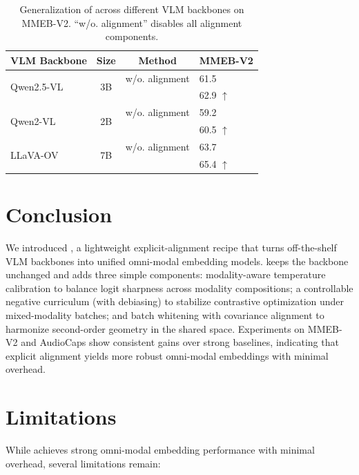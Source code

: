 
\begin{table}[t]
    \centering
    \small
    \caption{Generalization of \ours{} across different VLM backbones on MMEB-V2. ``w/o. alignment'' disables all alignment components.}\label{tab:generalization}
    \begin{tabular}{l c c l
    }
    \toprule
    \textbf{VLM Backbone} & \textbf{Size} & \textbf{Method} & \textbf{MMEB-V2} \\
    \midrule
    \multirow{2}{*}{Qwen2.5-VL} & \multirow{2}{*}{3B} 
        & w/o. alignment & 61.5 \\
     &  & \ours{} & 62.9 $\uparrow$ \\
    \midrule
    \multirow{2}{*}{Qwen2-VL} & \multirow{2}{*}{2B} 
        & w/o. alignment & 59.2 \\
     &  & \ours{} & 60.5 $\uparrow$ \\
    \midrule
    \multirow{2}{*}{LLaVA-OV} & \multirow{2}{*}{7B} 
        & w/o. alignment & 63.7 \\
     &  & \ours{} & 65.4 $\uparrow$ \\
    \bottomrule
    \end{tabular}
\end{table}

\section{Conclusion}

We introduced \ours{}, a lightweight explicit-alignment recipe that turns off-the-shelf VLM backbones into unified omni-modal embedding models.
\ours{} keeps the backbone unchanged and adds three simple components: modality-aware temperature calibration to balance logit sharpness across modality compositions; a controllable negative curriculum (with debiasing) to stabilize contrastive optimization under mixed-modality batches; and batch whitening with covariance alignment to harmonize second-order geometry in the shared space.
Experiments on MMEB-V2 and AudioCaps show consistent gains over strong baselines, indicating that explicit alignment yields more robust omni-modal embeddings with minimal overhead.



\clearpage

\section*{Limitations}
While \ours{} achieves strong omni-modal embedding performance with minimal overhead, several limitations remain:

